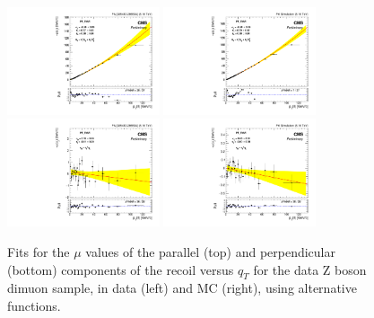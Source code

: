\begin{figure} [!htbp]
\begin{center}
\includegraphics[width=0.4\textwidth]{Figures/WBoson/Analysis/Correction/Recoil/Syst/SystPt/Data/fitPFu1mean.pdf}
\includegraphics[width=0.4\textwidth]{Figures/WBoson/Analysis/Correction/Recoil/Syst/SystPt/MC/fitPFu1mean.pdf} \\
\includegraphics[width=0.4\textwidth]{Figures/WBoson/Analysis/Correction/Recoil/Syst/SystPt/Data/fitPFu2mean.pdf}
\includegraphics[width=0.4\textwidth]{Figures/WBoson/Analysis/Correction/Recoil/Syst/SystPt/MC/fitPFu2mean.pdf}
\caption{Fits for the $\mu$ values of the parallel (top) and perpendicular (bottom) components of the recoil versus $q_{T}$ for the data Z boson dimuon sample, in data (left) and MC (right), using alternative functions.}
\label{fig:figU12RecoilScaleFit_pol}
\end{center}
\end{figure}

